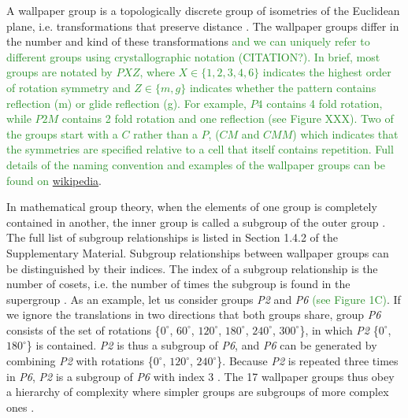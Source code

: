 \documentclass[11pt, twoside]{article}
\begin{document}
A wallpaper group is a topologically discrete group of isometries of the Euclidean plane, i.e. transformations that preserve distance \citep{RN1425}. The wallpaper groups differ in the number and kind of these transformations \textcolor{ForestGreen}{and we can uniquely refer to different groups using crystallographic notation (CITATION?). In brief, most groups are notated by $PXZ$, where $X\in\{1,2,3,4,6\}$ indicates the highest order of rotation symmetry and $Z\in\{m, g\}$ indicates whether the pattern contains reflection (m) or glide reflection (g). For example, $P4$ contains 4 fold rotation, while $P2M$ contains 2 fold rotation and one reflection (see Figure XXX). Two of the groups start with a $C$ rather than a $P$, ($CM$ and $CMM$) which indicates that the symmetries are specified relative to a cell that itself contains repetition. Full details of the naming convention and examples of the wallpaper groups can be found on \href{https://en.wikipedia.org/wiki/Wallpaper_group}{wikipedia}}.

In mathematical group theory, when the elements of one group is completely contained in another, the inner group is called a subgroup of the outer group \citep{RN1425}. The full list of subgroup relationships is listed in Section 1.4.2 of the Supplementary Material. Subgroup relationships between wallpaper groups can be distinguished by their indices. The index of a subgroup relationship is the number of cosets, i.e. the number of times the subgroup is found in the supergroup \citep{RN1425}. As an example, let us consider groups \textit{P2} and \textit{P6} \textcolor{ForestGreen}{(see Figure 1C)}. If we ignore the translations in two directions that both groups share, group \textit{P6} consists of the set of rotations \{$0^{\circ}$, $60^{\circ}$, $120^{\circ}$, $180^{\circ}$, $240^{\circ}$, $300^{\circ}$\}, in which \textit{P2} \{$0^{\circ}$, $180^{\circ}$\} is contained. \textit{P2} is thus a subgroup of \textit{P6}, and \textit{P6} can be generated by combining \textit{P2} with rotations \{$0^{\circ}$, $120^{\circ}$, $240^{\circ}$\}. Because \textit{P2} is repeated three times in \textit{P6}, \textit{P2} is a subgroup of \textit{P6} with index 3 \citep{RN1425}. The 17 wallpaper groups thus obey a hierarchy of complexity where simpler groups are subgroups of more complex ones \citep{RN1711}. 
\end{document}
